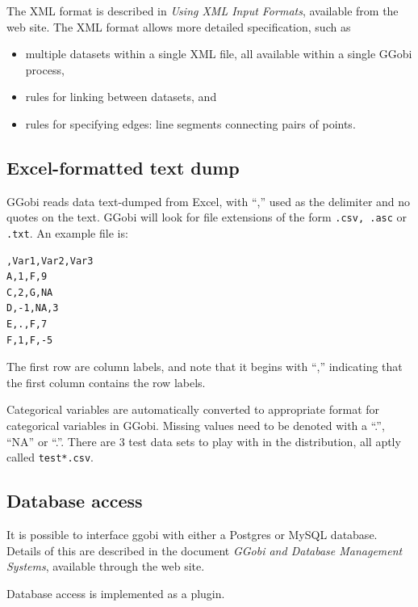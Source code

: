\documentclass[11pt]{article}
\begin{document}
The XML format is described in {\em Using XML Input Formats},
available from the web site.  The XML format allows more detailed
specification, such as

\begin{itemize}
\item multiple datasets within a single XML file, all available within
      a single GGobi process,
\item rules for linking between datasets, and
\item rules for specifying edges: line segments connecting pairs of points.
\end{itemize}

\subsection {Excel-formatted text dump}
\label{slbl:excel}

GGobi reads data text-dumped from Excel, with ``,'' used as the
delimiter and no quotes on the text. GGobi will look for file
extensions of the form {\tt .csv, .asc} or {\tt .txt}. An example file
is:

\begin{verbatim}
,Var1,Var2,Var3
A,1,F,9
C,2,G,NA
D,-1,NA,3
E,.,F,7
F,1,F,-5
\end{verbatim}

The first row are column labels, and note that it begins with
``,'' indicating that the first column contains the row labels.

Categorical variables are automatically converted to appropriate
format for categorical variables in GGobi. Missing values need to be
denoted with a ``.'', ``NA'' or ``.''. There are 3 test data sets to
play with in the distribution, all aptly called {\tt test*.csv}.

\subsection {Database access}
\label{slbl:MySQL}

It is possible to interface ggobi with either a Postgres or MySQL
database. Details of this are described in the document {\em GGobi and
Database Management Systems}, available through the web site. 

Database access is implemented as a plugin.
\end{document}
